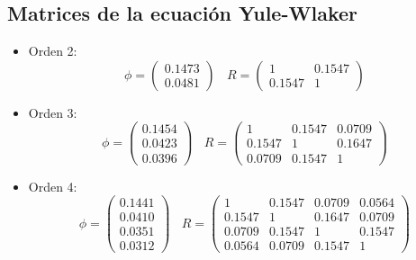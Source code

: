 \subsection{Matrices de la ecuación Yule-Wlaker}
\begin{itemize}

\item Orden 2:
\begin{equation*}
	\phi = 
	\begin{pmatrix}
		0.1473 \\
		0.0481  
	\end{pmatrix}	\	\	\	\
	R =
	\begin{pmatrix}
		1 & 0.1547 \\
		0.1547 & 1					  
	\end{pmatrix}
\end{equation*}

\item Orden 3:
\begin{equation*}
	\phi = 
	\begin{pmatrix}
		0.1454 \\
		0.0423 \\
		0.0396  
	\end{pmatrix}	\	\	\	\
	R =
	\begin{pmatrix}
		1 		& 0.1547 	& 0.0709 \\
		0.1547 	& 1 		& 0.1647 \\
		0.0709 	& 0.1547 	& 1					  
	\end{pmatrix}
\end{equation*}

\item Orden 4:
\begin{equation*}
	\phi = 
	\begin{pmatrix}
		0.1441 \\
		0.0410 \\
		0.0351 \\
		0.0312
	\end{pmatrix}	\	\	\	\
	R =
	\begin{pmatrix}
		1 		& 0.1547 	& 0.0709 	& 0.0564 \\
		0.1547 	& 1 		& 0.1647 	& 0.0709 \\
		0.0709 	& 0.1547 	& 1			& 0.1547 \\
		0.0564	& 0.0709	& 0.1547	& 1		  
	\end{pmatrix}
\end{equation*}


\end{itemize}
